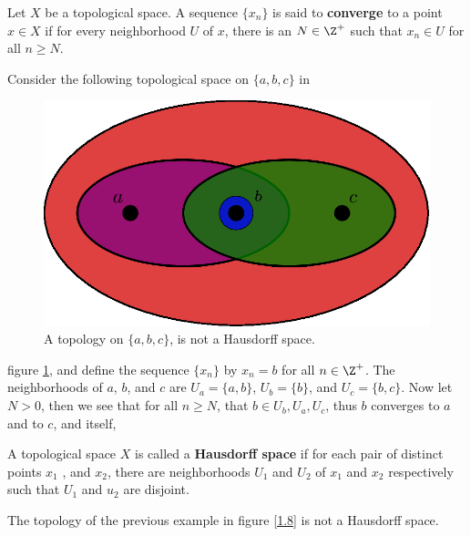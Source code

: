 \begin{definition}
    Let $X$ be a topological space. A sequence  $\{x_n\}$ is said to
    \textbf{converge} to a point  $x \in X$ if for every neighborhood  $U$ of
    $x$, there is an  $N \in \Z^+$ such that  $x_n \in U$ for all  $n \geq N$.
\end{definition}

\begin{example}
    Consider the following topological space on $\{a,b,c\}$ in
    \begin{figure}[h]
        \centering
        \includegraphics[scale = 0.5]{Figures/Chapter1/non_hausdorff_space.eps}
        \caption{A topology on $\{a,b,c\}$, is not a Hausdorff space.}
        \label{fig1.8}
    \end{figure}
    figure \ref{fig1.8}, and define the sequence $\{x_n\}$ by  $x_n=b$ for all
    $n \in \Z^+$. The neighborhoods of  $a$, $b$, and $c$ are
    $U_a=\{a,b\}$,  $U_b=\{b\}$, and  $U_c=\{b,c\}$. Now let $N>0$, then we see
    that for all  $n \geq N$, that  $b \in U_b,U_a,U_c$, thus  $b$
    converges to  $a$ and to  $c$, and itself,
\end{example}

\begin{definition}
    A topological space $X$ is called a \textbf{Hausdorff space} if for each
    pair of distinct points  $ x_1$ , and $x_2$, there are neighborhoods $ U_1$
    and $U_2$ of $ x_1$ and $ x_2$ respectively such that $ U_1$ and $ u_2$ are
    disjoint.
\end{definition}

\begin{example}
    The topology of the previous example in figure \ref{1.8} is not a Hausdorff
    space.
\end{example}

